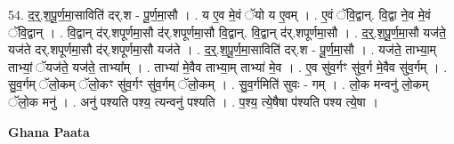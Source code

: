 \documentclass[17pt]{extarticle}
\begin{document}
54. द॒र्॒.श॒पू॒र्ण॒मा॒साविति॑ दर्.श - पू॒र्ण॒मा॒सौ । . य ए॒व मे॒वं ॅयो य ए॒वम् । . ए॒वं ॅवि॒द्वान्. वि॒द्वा ने॒व मे॒वं ॅवि॒द्वान् । . वि॒द्वान् द॑र्.शपूर्णमा॒सौ द॑र्.शपूर्णमा॒सौ वि॒द्वान्. वि॒द्वान् द॑र्.शपूर्णमा॒सौ । . द॒र्॒.श॒पू॒र्ण॒मा॒सौ यज॑ते॒ यज॑ते दर्.शपूर्णमा॒सौ द॑र्.शपूर्णमा॒सौ यज॑ते । . द॒र्॒.श॒पू॒र्ण॒मा॒साविति॑ दर्.श - पू॒र्ण॒मा॒सौ । . यज॑ते॒ ताभ्या॒म् ताभ्यां॒ ॅयज॑ते॒ यज॑ते॒ ताभ्या᳚म् । . ताभ्या॑ मे॒वैव ताभ्या॒म् ताभ्या॑ मे॒व । . ए॒व सु॑व॒र्गꣳ सु॑व॒र्ग मे॒वैव सु॑व॒र्गम् । . सु॒व॒र्गम् ॅलो॒कम् ॅलो॒कꣳ सु॑व॒र्गꣳ सु॑व॒र्गम् ॅलो॒कम् । . सु॒व॒र्गमिति॑ सुवः - गम् । . लो॒क मन्वनु॑ लो॒कम् ॅलो॒क मनु॑ । . अनु॑ पश्यति पश्य॒ त्यन्वनु॑ पश्यति । . प॒श्य॒ त्ये॒षैषा प॑श्यति पश्य त्ये॒षा । \newline

\textbf{Ghana Paata } \newline
\end{document}
